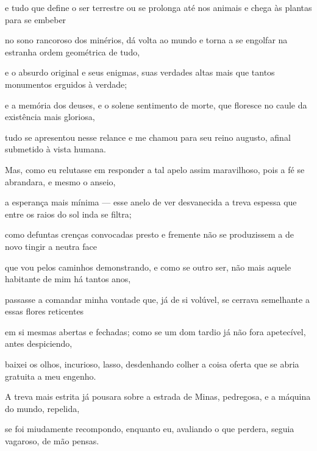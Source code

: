 e tudo que define o ser terrestre
ou se prolonga até nos animais
e chega às plantas para se embeber
 
no sono rancoroso dos minérios,
dá volta ao mundo e torna a se engolfar
na estranha ordem geométrica de tudo,
 
e o absurdo original e seus enigmas,
suas verdades altas mais que tantos
monumentos erguidos à verdade;
 
e a memória dos deuses, e o solene
sentimento de morte, que floresce
no caule da existência mais gloriosa,
 
tudo se apresentou nesse relance
e me chamou para seu reino augusto,
afinal submetido à vista humana.
 
Mas, como eu relutasse em responder
a tal apelo assim maravilhoso,
pois a fé se abrandara, e mesmo o anseio,
 
a esperança mais mínima — esse anelo
de ver desvanecida a treva espessa
que entre os raios do sol inda se filtra;
 
como defuntas crenças convocadas
presto e fremente não se produzissem
a de novo tingir a neutra face
 
que vou pelos caminhos demonstrando,
e como se outro ser, não mais aquele
habitante de mim há tantos anos,
 
passasse a comandar minha vontade
que, já de si volúvel, se cerrava
semelhante a essas flores reticentes
 
em si mesmas abertas e fechadas;
como se um dom tardio já não fora
apetecível, antes despiciendo,
 
baixei os olhos, incurioso, lasso,
desdenhando colher a coisa oferta
que se abria gratuita a meu engenho.
 
A treva mais estrita já pousara
sobre a estrada de Minas, pedregosa,
e a máquina do mundo, repelida,
 
se foi miudamente recompondo,
enquanto eu, avaliando o que perdera,
seguia vagaroso, de mão pensas.